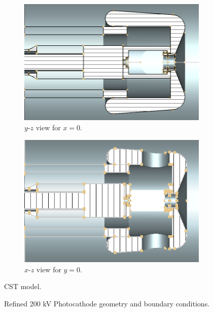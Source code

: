 \begin{center}
\begin{figure}[H]
   \begin{subfigure}{0.45\textwidth}
      \includegraphics[width=\textwidth]{figures/200kV/png/v1_cutx}
      \caption{$y$-$z$ view for $x=0$.}
      \label{fig:cst_geometry_yz}
   \end{subfigure}
   \begin{subfigure}{0.45\textwidth}
      \includegraphics[width=\textwidth]{figures/200kV/png/v1_cuty}
      \caption{$x$-$z$ view for $y=0$.}
      \label{fig:cst_geometry_xz}
   \end{subfigure}
   \caption{CST model.}
\end{figure}
\end{center}

\begin{center}
\begin{figure}[H]
  
  \caption{Refined 200 kV Photocathode geometry and boundary conditions.}
  \label{fig:200kV_geometry_v1}
\end{figure}
\end{center}

